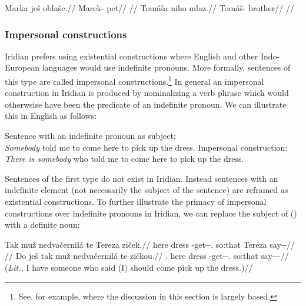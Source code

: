 \begin{multicols}{2}
\pex
  \begingl
    \gla Marka ješ oblašc.//
    \glb Marek-\Acc{} \Exst{} pet//
    \glft {}//
  \endgl
\xe
\pex
  \begingl
    \gla Tomáša niho mlaz.//
    \glb Tomáš-\Acc{} \N{}\Exst{} brother//
    \glft {}//
  \endgl
\xe
\end{multicols}

\subsubsection{Impersonal constructions}

Iridian prefers using existential constructions where English and
other Indo-European languages would use indefinite pronouns. More formally,
sentences of this type are called impersonal constructions.\footnote{See, for
example, \textcite{lawtagalog} where the discussion in this section is largely
based.} In general an impersonal construction in Iridian is produced by
nominalizing a verb phrase which would otherwsise have
been the predicate of an indefinite pronoun. We can illustrate this in English
as follows:

\pex
\a  {}Sentence with an indefinite pronoun as subject:\\
    \emph{Somebody} told me to come here to pick up the dress.
\a  Impersonal construction:\\
    \emph{There is somebody} who told me to come here to pick up the dress.
\xe

Sentences of the first type do not exist in Iridian. Instead sentences with an
indefinite element (not necessarily the subject of the sentence) are reframed as
existential constructions. To further illustrate the primacy of impersonal
constructions over indefinite pronouns in Iridian, we can replace the subject of
() with a definite noun:

\pex
\a\begingl
    \gla Tak muž nedvačernilá te Tereza ziček.//
    \glb here dress \Caus{}-get-\Pv{}-\Subj{}.\Ipf{} so:that Tereza say-\Av{}-\Pf{}//
    \glft {}//
  \endgl
\a\begingl
    \gla Do ješ tak muž nedvačernilá te zičkou.//
    \glb \First{}\Sg{}.\Acc{} \Exst{} here dress \Caus{}-get-\Pv{}-\Subj{}.\Ipf{} so:that say-\Av{}-\Pf{}-\Nz{}//
    \glft {} (\emph{Lit.,} I have someone who said (I) should come pick up the dress.)//
  \endgl
\xe


